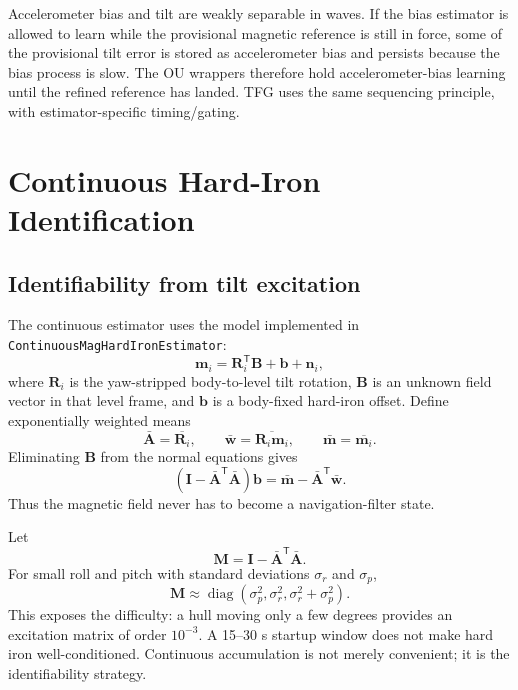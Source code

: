 \documentclass[conference]{IEEEtran}
\DeclareRobustCommand{\vct}[1]{\bm{#1}}
\DeclareRobustCommand{\mat}[1]{\bm{#1}}
\newcommand{\T}{^{\mathsf T}}
\newcommand{\diag}{\operatorname{diag}}
\begin{document}
Accelerometer bias and tilt are weakly separable in waves.  If the bias estimator is
allowed to learn while the provisional magnetic reference is still in force, some of
the provisional tilt error is stored as accelerometer bias and persists because the
bias process is slow.  The OU wrappers therefore hold accelerometer-bias learning
until the refined reference has landed.
TFG uses the same sequencing principle, with estimator-specific timing/gating.

\section{Continuous Hard-Iron Identification}
\label{sec:hardiron}

\subsection{Identifiability from tilt excitation}

The continuous estimator uses the model implemented in
\texttt{ContinuousMagHardIronEstimator}:
\begin{equation}
\vct m_i = \mat R_i\T\vct B + \vct b + \vct n_i,
\label{eq:hi-model}
\end{equation}
where $\mat R_i$ is the yaw-stripped body-to-level tilt rotation, $\vct B$ is an
unknown field vector in that level frame, and $\vct b$ is a body-fixed hard-iron
offset.  Define exponentially weighted means
\begin{equation}
\bar{\mat A}=\overline{\mat R_i},\qquad
\bar{\vct w}=\overline{\mat R_i\vct m_i},\qquad
\bar{\vct m}=\overline{\vct m_i}.
\end{equation}
Eliminating $\vct B$ from the normal equations gives
\begin{equation}
\left(\mat I-\bar{\mat A}\T\bar{\mat A}\right)\vct b
 = \bar{\vct m}-\bar{\mat A}\T\bar{\vct w}.
\label{eq:hi-normal}
\end{equation}
Thus the magnetic field never has to become a navigation-filter state.

Let
\begin{equation}
\mat M=\mat I-\bar{\mat A}\T\bar{\mat A}.
\label{eq:M}
\end{equation}
For small roll and pitch with standard deviations $\sigma_r$ and $\sigma_p$,
\begin{equation}
\mat M\approx
\diag\!\left(\sigma_p^2,\sigma_r^2,
\sigma_r^2+\sigma_p^2\right).
\label{eq:small-angle-information}
\end{equation}
This exposes the difficulty: a hull moving only a few degrees provides an excitation
matrix of order $10^{-3}$.  A 15--30 s startup window does not make hard iron
well-conditioned.  Continuous accumulation is not merely convenient; it is the
identifiability strategy.
\end{document}
